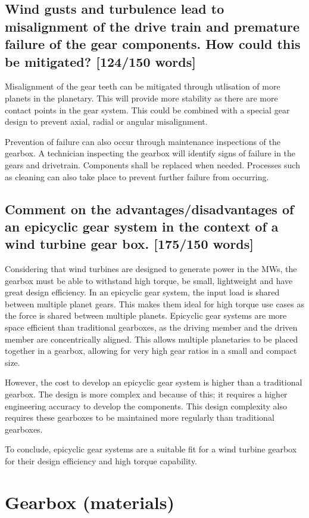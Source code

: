 \documentclass[12pt]{article}
\numberwithin{equation}{section}
\begin{document}
\begin{flushleft}
\subsection[Misalignment and failure prevention.]{Wind gusts and turbulence lead to misalignment of the drive train and premature failure of the gear components. How could this be mitigated? [124/150 words]}
Misalignment of the gear teeth can be mitigated through utlisation of more planets in the planetary. This will provide more stability as there are more contact points in the gear system. This could be combined with a special gear design to prevent axial, radial or angular misalignment. 

Prevention of failure can also occur through maintenance inspections of the gearbox. A technician inspecting the gearbox will identify signs of failure in the gears and drivetrain. Components shall be replaced when needed. Processes such as cleaning can also take place to prevent further failure from occurring.

\subsection[Advantages/disadvantages of an epicyclic gearbox.]{Comment on the advantages/disadvantages of an epicyclic gear system in the context of a wind turbine gear box. [175/150 words]}
Considering that wind turbines are designed to generate power in the MWs, the gearbox must be able to withstand high torque, be small, lightweight and have great design efficiency. In an epicyclic gear system, the input load is shared between multiple planet gears. This makes them ideal for high torque use cases as the force is shared between multiple planets. Epicyclic gear systems are more space efficient than traditional gearboxes, as the driving member and the driven member are concentrically aligned. This allows multiple planetaries to be placed together in a gearbox, allowing for very high gear ratios in a small and compact size.

However, the cost to develop an epicyclic gear system is higher than a traditional gearbox. The design is more complex and because of this; it requires a higher engineering accuracy to develop the components. This design complexity also requires these gearboxes to be maintained more regularly than traditional gearboxes.

To conclude, epicyclic gear systems are a suitable fit for a wind turbine gearbox for their design efficiency and high torque capability.
\section{Gearbox (materials)}

\end{flushleft}
\end{document}
